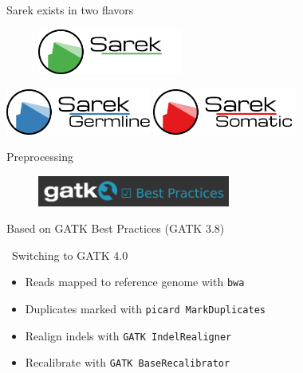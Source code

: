 \documentclass[usepdftitle=false]{beamer}
\begin{document}
\begin{frame}{Sarek exists in two flavors}
	\begin{figure}
		\includegraphics[height=1.5cm]{pictures/Sarek}
	\end{figure}
	\vfill
	\pause
	\begin{center}
		\includegraphics[height=1.5cm]{pictures/Sarek_germline}
		\hfill
		\pause
		\includegraphics[height=1.5cm]{pictures/Sarek_somatic}
	\end{center}
	\end{frame}

\begin{frame}{Preprocessing}
	\begin{figure}
		\includegraphics[height=1cm]{pictures/GATKBP}
	\end{figure}
	Based on GATK Best Practices (GATK 3.8)

	\faWrench\ Switching to GATK 4.0
	\pause

	\begin{itemize}
		\item Reads mapped to reference genome with \texttt{bwa}
		\pause
		\item Duplicates marked with \texttt{picard MarkDuplicates}
		\pause
		\item Realign indels with \texttt{GATK IndelRealigner}
		\pause
		\item Recalibrate with \texttt{GATK BaseRecalibrator}
	\end{itemize}

\end{frame}
\end{document}
